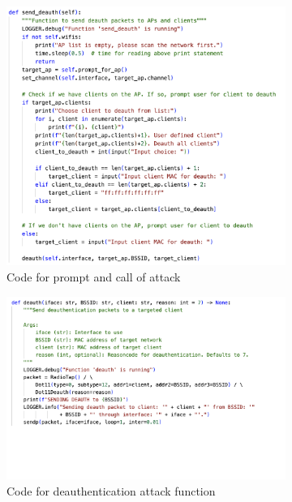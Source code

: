 \begin{figure}[!htbp]
     \centering
     \begin{subfigure}{0.49\textwidth}
         \centering
         \includegraphics[width=\textwidth]{Latex-Files/Billeder/Implementation/deauth_prompt.png}
         \caption{Code for prompt and call of attack}
         \label{deauth_prompt_code}
     \end{subfigure}
     \hfill
     \begin{subfigure}{0.49\textwidth}
         \centering
         \includegraphics[width=\textwidth]{Latex-Files/Billeder/Implementation/deauth_packets.png}
         \caption{Code for deauthentication attack function}
         \label{deauth_func_code}
     \end{subfigure}
     \hfill
     \caption{}
\end{figure}

